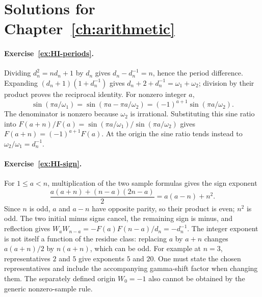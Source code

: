 \section{Solutions for Chapter~\ref{ch:arithmetic}}

\paragraph{Exercise~\ref{ex:HI-periods}.}
\label{sol:ex:HI-periods}
Dividing $d_n^2=nd_n+1$ by $d_n$ gives
$d_n-d_n^{-1}=n$, hence the period difference.
Expanding $(d_n+1)(1+d_n^{-1})$ gives
$d_n+2+d_n^{-1}=\omega_1+\omega_2$; division by their
product proves the reciprocal identity.  For nonzero integer
$a$,
\[
 \sin(\pi a/\omega_1)
 =\sin(\pi a-\pi a/\omega_2)
 =(-1)^{a+1}\sin(\pi a/\omega_2).
\]
The denominator is nonzero because $\omega_2$ is irrational.
Substituting this sine ratio into
$F(a+n)/F(a)=\sin(\pi a/\omega_1)/\sin(\pi a/\omega_2)$
gives $F(a+n)=(-1)^{a+1}F(a)$.
At the origin the sine ratio tends instead to
$\omega_2/\omega_1=d_n^{-1}$.



\paragraph{Exercise~\ref{ex:HI-sign}.}
\label{sol:ex:HI-sign}
For $1\leq a<n$, multiplication of the two sample formulas gives
the sign exponent
\[
 \frac{a(a+n)+(n-a)(2n-a)}2=a(a-n)+n^2.
\]
Since $n$ is odd, $a$ and $a-n$ have opposite parity, so their
product is even; $n^2$ is odd. The two initial minus signs cancel,
the remaining sign is minus, and reflection gives
$W_aW_{n-a}=-F(a)F(n-a)/d_n=-d_n^{-1}$.
The integer exponent is not itself a function of the residue class:
replacing $a$ by $a+n$ changes $a(a+n)/2$ by $n(a+n)$,
which can be odd. For example at $n=3$, representatives $2$ and
$5$ give exponents $5$ and $20$. One must state the chosen
representatives and include the accompanying gamma-shift factor
when changing them. The separately defined origin $W_0=-1$
also cannot be obtained by the generic nonzero-sample rule.



